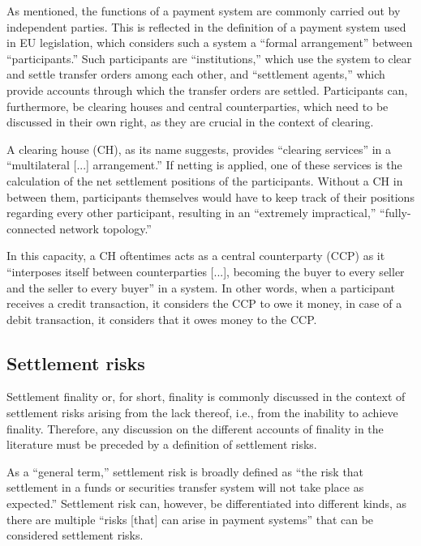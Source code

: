 As mentioned, the functions of a payment system are commonly carried out by independent parties.
This is reflected in the definition of a payment system used in EU legislation, which considers such a system a ``formal arrangement'' between ``participants.'' \autocite{eu1998}
Such participants are ``institutions,'' which use the system to clear and settle transfer orders among each other, and ``settlement agents,'' which provide accounts through which the transfer orders are settled. \autocite{eu1998}
Participants can, furthermore, be clearing houses and central counterparties, which need to be discussed in their own right, as they are crucial in the context of clearing.

A clearing house (CH), as its name suggests, provides ``clearing services'' in a ``multilateral [...] arrangement.'' \autocite[4]{cpmi2016}
If netting is applied, one of these services is the calculation of the net settlement positions of the participants.
Without a CH in between them, participants themselves would have to keep track of their positions regarding every other participant, resulting in an ``extremely impractical,'' ``fully-connected network topology.'' \autocite[23]{megue2018}

In this capacity, a CH oftentimes acts as a central counterparty (CCP) as it ``interposes itself between counterparties [...], becoming the buyer to every seller and the seller to every buyer'' \autocite[3]{cpmi2016} in a system.
In other words, when a participant receives a credit transaction, it considers the CCP to owe it money, in case of a debit transaction, it considers that it owes money to the CCP. \autocite[24]{megue2018}

\subsection{Settlement risks}

Settlement finality or, for short, finality is commonly discussed in the context of settlement risks arising from the lack thereof, i.e., from the inability to achieve finality.
Therefore, any discussion on the different accounts of finality in the literature must be preceded by a definition of settlement risks.

As a ``general term,'' settlement risk is broadly defined as ``the risk that settlement in a funds or securities transfer system will not take place as expected.'' \autocite[17]{cpmi2016}
Settlement risk can, however, be differentiated into different kinds, as there are multiple ``risks [that] can arise in payment systems'' \autocite[5]{cpmi2001} that can be considered settlement risks.

